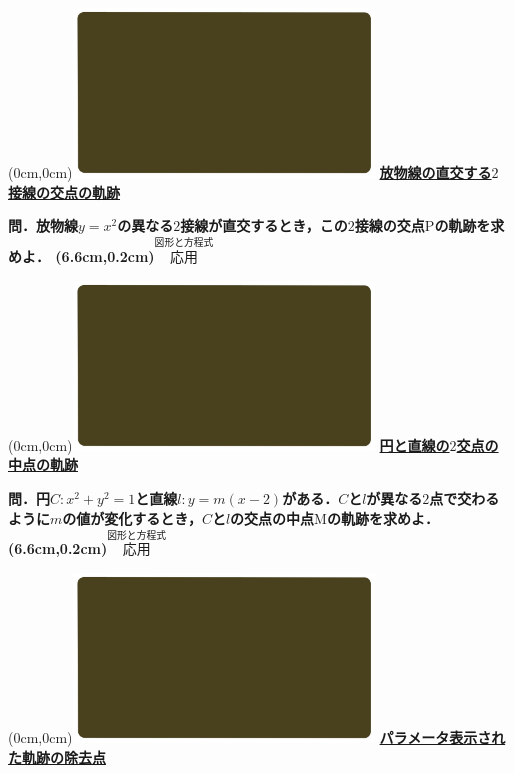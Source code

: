 \documentclass[10pt,
fleqn,
dvipdfmx,
uplatex
]{jsarticle}
\begin{document}
\newpage



\at(0cm,0cm){\includegraphics[width=8cm,bb=0 0 1920 1080]{./youtube/thumbnails/templates/smart_background/図形と方程式.jpeg}}
{\color{orange}\bf\boldmath\large\underline{放物線の直交する$2$接線の交点の軌跡}}\vspace{0.3zw}

\LARGE 
\bf\boldmath 問．放物線$y=x^2$の異なる$2$接線が直交するとき，この$2$接線の交点$\text{P}$の軌跡を求めよ．
\at(6.6cm,0.2cm){\small\color{bradorange}$\overset{\text{図形と方程式}}{\text{応用}}$}


\newpage



\at(0cm,0cm){\includegraphics[width=8cm,bb=0 0 1920 1080]{./youtube/thumbnails/templates/smart_background/図形と方程式.jpeg}}
{\color{orange}\bf\boldmath\Large\underline{円と直線の$2$交点の中点の軌跡}}\vspace{0.3zw}

\Large 
\bf\boldmath 問．円$C:x^2+y^2=1$と直線$l:y=m\left(x-2\right)$がある．$C$と$l$が異なる$2$点で交わるように$m$の値が変化するとき，$C$と$l$の交点の中点$\text{M}$の軌跡を求めよ．
\at(6.6cm,0.2cm){\small\color{bradorange}$\overset{\text{図形と方程式}}{\text{応用}}$}


\newpage



\at(0cm,0cm){\includegraphics[width=8cm,bb=0 0 1920 1080]{./youtube/thumbnails/templates/smart_background/図形と方程式.jpeg}}
{\color{orange}\bf\boldmath\large\underline{パラメータ表示された軌跡の除去点}}\vspace{0.3zw}
\end{document}
